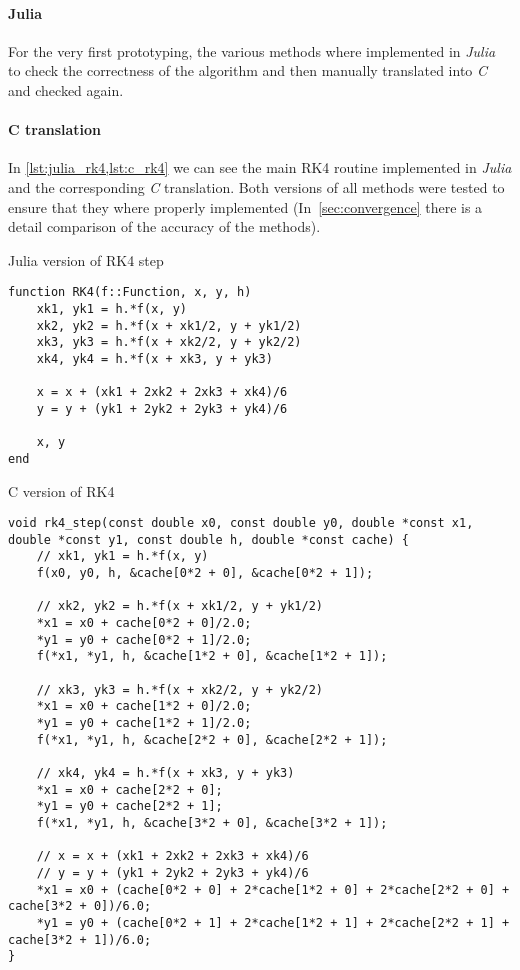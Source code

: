 \paragraph{Julia}
For the very first prototyping, the various methods where implemented in \emph{Julia}
to check the correctness of the algorithm and then manually translated into \emph{C}
and checked again.

\paragraph{C translation}

In \cref{lst:julia_rk4,lst:c_rk4} we can see the main RK4 routine implemented in \emph{Julia} and the corresponding \emph{C} translation. Both versions of all methods were tested to ensure that they where properly implemented (In~\cref{sec:convergence} there is a detail comparison of the accuracy of the methods).



\begin{listing}[H]
    \caption{Julia version of RK4 step}
    \label{lst:julia_rk4}
\begin{verbatim}
function RK4(f::Function, x, y, h)
    xk1, yk1 = h.*f(x, y)
    xk2, yk2 = h.*f(x + xk1/2, y + yk1/2)
    xk3, yk3 = h.*f(x + xk2/2, y + yk2/2)
    xk4, yk4 = h.*f(x + xk3, y + yk3)

    x = x + (xk1 + 2xk2 + 2xk3 + xk4)/6
    y = y + (yk1 + 2yk2 + 2yk3 + yk4)/6

    x, y
end
\end{verbatim}
\end{listing}

\begin{listing}[H]
    \caption{C version of RK4}
    \label{lst:c_rk4}
\begin{verbatim}
void rk4_step(const double x0, const double y0, double *const x1, double *const y1, const double h, double *const cache) {
    // xk1, yk1 = h.*f(x, y)
    f(x0, y0, h, &cache[0*2 + 0], &cache[0*2 + 1]);

    // xk2, yk2 = h.*f(x + xk1/2, y + yk1/2)
    *x1 = x0 + cache[0*2 + 0]/2.0;
    *y1 = y0 + cache[0*2 + 1]/2.0;
    f(*x1, *y1, h, &cache[1*2 + 0], &cache[1*2 + 1]);

    // xk3, yk3 = h.*f(x + xk2/2, y + yk2/2)
    *x1 = x0 + cache[1*2 + 0]/2.0;
    *y1 = y0 + cache[1*2 + 1]/2.0;
    f(*x1, *y1, h, &cache[2*2 + 0], &cache[2*2 + 1]);

    // xk4, yk4 = h.*f(x + xk3, y + yk3)
    *x1 = x0 + cache[2*2 + 0];
    *y1 = y0 + cache[2*2 + 1];
    f(*x1, *y1, h, &cache[3*2 + 0], &cache[3*2 + 1]);

    // x = x + (xk1 + 2xk2 + 2xk3 + xk4)/6
    // y = y + (yk1 + 2yk2 + 2yk3 + yk4)/6
    *x1 = x0 + (cache[0*2 + 0] + 2*cache[1*2 + 0] + 2*cache[2*2 + 0] + cache[3*2 + 0])/6.0;
    *y1 = y0 + (cache[0*2 + 1] + 2*cache[1*2 + 1] + 2*cache[2*2 + 1] + cache[3*2 + 1])/6.0;
}
\end{verbatim}
\end{listing}


